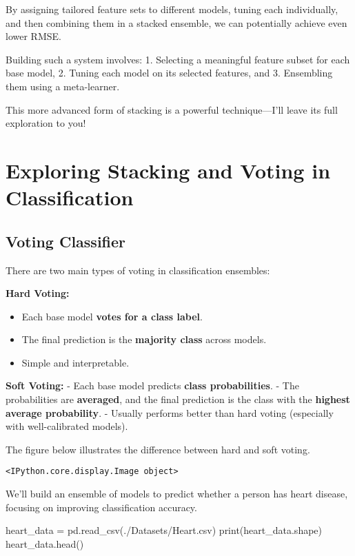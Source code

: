 \documentclass[
  letterpaper,
  DIV=11,
  numbers=noendperiod]{scrreprt}
\newenvironment{Shaded}{\begin{snugshade}}{\end{snugshade}}
\newcommand{\BuiltInTok}[1]{\textcolor[rgb]{0.00,0.23,0.31}{#1}}
\newcommand{\NormalTok}[1]{\textcolor[rgb]{0.00,0.23,0.31}{#1}}
\newcommand{\OperatorTok}[1]{\textcolor[rgb]{0.37,0.37,0.37}{#1}}
\newcommand{\StringTok}[1]{\textcolor[rgb]{0.13,0.47,0.30}{#1}}
\providecommand{\tightlist}{%
  \setlength{\itemsep}{0pt}\setlength{\parskip}{0pt}}\usepackage{longtable,booktabs,array}
\begin{document}
By assigning tailored feature sets to different models, tuning each
individually, and then combining them in a stacked ensemble, we can
potentially achieve even lower RMSE.

Building such a system involves: 1. Selecting a meaningful feature
subset for each base model, 2. Tuning each model on its selected
features, and 3. Ensembling them using a meta-learner.

This more advanced form of stacking is a powerful technique---I'll leave
its full exploration to you!

\section{Exploring Stacking and Voting in
Classification}\label{exploring-stacking-and-voting-in-classification}

\subsection{Voting Classifier}\label{voting-classifier}

There are two main types of voting in classification ensembles:

\textbf{Hard Voting:}

\begin{itemize}
\tightlist
\item
  Each base model \textbf{votes for a class label}.
\item
  The final prediction is the \textbf{majority class} across models.
\item
  Simple and interpretable.
\end{itemize}

\textbf{Soft Voting:} - Each base model predicts \textbf{class
probabilities}. - The probabilities are \textbf{averaged}, and the final
prediction is the class with the \textbf{highest average probability}. -
Usually performs better than hard voting (especially with
well-calibrated models).

The figure below illustrates the difference between hard and soft
voting.

\begin{verbatim}
<IPython.core.display.Image object>
\end{verbatim}

We'll build an ensemble of models to predict whether a person has heart
disease, focusing on improving classification accuracy.

\begin{Shaded}
\begin{Highlighting}[]
\NormalTok{heart\_data }\OperatorTok{=}\NormalTok{ pd.read\_csv(}\StringTok{\textquotesingle{}./Datasets/Heart.csv\textquotesingle{}}\NormalTok{)}
\BuiltInTok{print}\NormalTok{(heart\_data.shape)}
\NormalTok{heart\_data.head()}
\end{Highlighting}
\end{Shaded}
\end{document}
